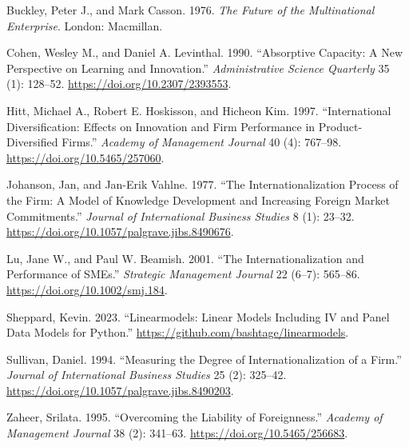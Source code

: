 \documentclass[
  11pt,
  letterpaper,
  DIV=11,
  numbers=noendperiod]{scrartcl}
\newlength{\cslhangindent}
\newenvironment{CSLReferences}[2] %
 {\begin{list}{}{%
  \setlength{\itemindent}{0pt}
  \setlength{\leftmargin}{0pt}
  \setlength{\parsep}{0pt}
  \ifodd #1
   \setlength{\leftmargin}{\cslhangindent}
   \setlength{\itemindent}{-1\cslhangindent}
  \fi
  \setlength{\itemsep}{#2\baselineskip}}}
 {\end{list}}
\begin{document}
\label{refs}
\begin{CSLReferences}{1}{0}
Buckley, Peter J., and Mark Casson. 1976. \emph{The Future of the
Multinational Enterprise}. London: Macmillan.

Cohen, Wesley M., and Daniel A. Levinthal. 1990. {``Absorptive Capacity:
A New Perspective on Learning and Innovation.''} \emph{Administrative
Science Quarterly} 35 (1): 128--52.
\url{https://doi.org/10.2307/2393553}.

Hitt, Michael A., Robert E. Hoskisson, and Hicheon Kim. 1997.
{``International Diversification: Effects on Innovation and Firm
Performance in Product-Diversified Firms.''} \emph{Academy of Management
Journal} 40 (4): 767--98. \url{https://doi.org/10.5465/257060}.

Johanson, Jan, and Jan-Erik Vahlne. 1977. {``The Internationalization
Process of the Firm: A Model of Knowledge Development and Increasing
Foreign Market Commitments.''} \emph{Journal of International Business
Studies} 8 (1): 23--32.
\url{https://doi.org/10.1057/palgrave.jibs.8490676}.

Lu, Jane W., and Paul W. Beamish. 2001. {``The Internationalization and
Performance of {SME}s.''} \emph{Strategic Management Journal} 22 (6--7):
565--86. \url{https://doi.org/10.1002/smj.184}.

Sheppard, Kevin. 2023. {``Linearmodels: Linear Models Including IV and
Panel Data Models for Python.''}
\url{https://github.com/bashtage/linearmodels}.

Sullivan, Daniel. 1994. {``Measuring the Degree of Internationalization
of a Firm.''} \emph{Journal of International Business Studies} 25 (2):
325--42. \url{https://doi.org/10.1057/palgrave.jibs.8490203}.

Zaheer, Srilata. 1995. {``Overcoming the Liability of Foreignness.''}
\emph{Academy of Management Journal} 38 (2): 341--63.
\url{https://doi.org/10.5465/256683}.

\end{CSLReferences}
\end{document}
